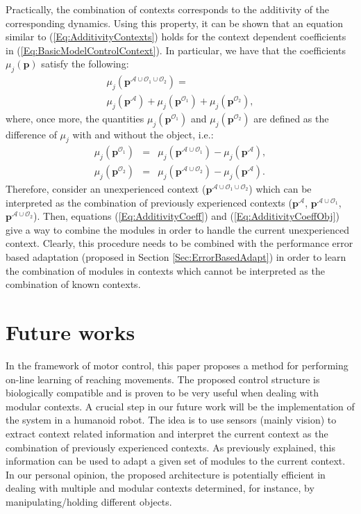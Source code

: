 \documentclass{svmult}
\begin{document}
Practically, the combination of contexts corresponds to the
additivity of the corresponding dynamics. Using this property, it
can be shown that an equation similar to
(\ref{Eq:AdditivityContexts}) holds for the context dependent
coefficients in (\ref{Eq:BasicModelControlContext}). In particular,
we have that the coefficients $\mu_j(\mathbf p)$ satisfy the
following:
\begin{multline} \label{Eq:AdditivityCoeff}
\mu_j({\mathbf p^{\mathcal A \cup \mathcal O_1 \cup \mathcal O_2}})
= \\ \mu_j({\mathbf p^{\mathcal A}}) + \mu_j({\mathbf p^{\mathcal
O_1}}) + \mu_j({\mathbf p^{\mathcal O_2}}),
\end{multline}
where, once more, the quantities $\mu_j({\mathbf p^{\mathcal O_1}})$
and $\mu_j({\mathbf p^{\mathcal O_2}})$ are defined as the
difference of $\mu_j$ with and without the object, i.e.:
\begin{subequations}\label{Eq:AdditivityCoeffObj}
\begin{eqnarray}
\mu_j({\mathbf p^{\mathcal O_1}}) & = & \mu_j({\mathbf p^{\mathcal A
\cup \mathcal O_1}}) - \mu_j({\mathbf p^{\mathcal A}}), \\
\mu_j({\mathbf p^{\mathcal O_2}}) & = & \mu_j({\mathbf p^{\mathcal A
\cup \mathcal O_2}}) - \mu_j({\mathbf p^{\mathcal A}}).
\end{eqnarray}
\end{subequations}
Therefore, consider an unexperienced context (${\mathbf p^{\mathcal
A \cup \mathcal O_1 \cup \mathcal O_2}}$) which can be interpreted
as the combination of previously experienced contexts (${\mathbf
p^{\mathcal A }}$, ${\mathbf p^{\mathcal A \cup \mathcal O_1}}$,
${\mathbf p^{\mathcal A \cup \mathcal O_2}}$). Then, equations
(\ref{Eq:AdditivityCoeff}) and (\ref{Eq:AdditivityCoeffObj}) give a
way to combine the modules in order to handle the current
unexperienced context. Clearly, this procedure needs to be combined
with the performance error based adaptation (proposed in Section
\ref{Sec:ErrorBasedAdapt}) in order to learn the combination of
modules in contexts which cannot be interpreted as the combination
of known contexts.

\section{Future works}

In the framework of motor control, this paper proposes a method for
performing on-line learning of reaching movements. The proposed
control structure is biologically compatible and is proven to be
very useful when dealing with modular contexts. A crucial step in
our future work will be the implementation of the system in a
humanoid robot. The idea is to use sensors (mainly vision) to
extract context related information and interpret the current
context as the combination of previously experienced contexts. As
previously explained, this information can be used to adapt a given
set of modules to the current context. In our personal opinion, the
proposed architecture is potentially efficient in dealing with
multiple and modular contexts determined, for instance, by
manipulating/holding different objects.
\end{document}
